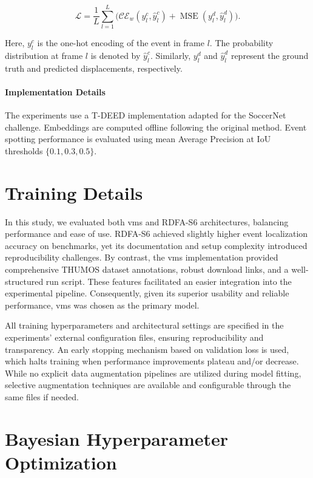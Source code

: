 \[
\mathcal{L} = \frac{1}{L}\sum_{l=1}^{L}\Big(\mathcal{CE}_{w}(y_l^{c},\hat{y}_l^c) + \operatorname{MSE}(y_l^{d},\hat{y}_l^d)\Big).
\]

Here, \(y_l^{c}\) is the one-hot encoding of the event in frame \(l\). The probability distribution at frame \(l\) is denoted by \(\hat{y}_l^c\). Similarly, \(y_l^{d}\) and \(\hat{y}_l^d\) represent the ground truth and predicted displacements, respectively.

\paragraph{Implementation Details} The experiments use a T-DEED implementation adapted for the SoccerNet challenge. Embeddings are computed offline following the original method. Event spotting performance is evaluated using mean Average Precision at IoU thresholds \(\{0.1,0.3,0.5\}\).


\section{Training Details}

In this study, we evaluated both \acrshort{vms} and RDFA-S6 architectures, balancing performance and ease of use. RDFA-S6 achieved slightly higher event localization accuracy on benchmarks, yet its documentation and setup complexity introduced reproducibility challenges. By contrast, the \acrshort{vms} implementation provided comprehensive THUMOS dataset annotations, robust download links, and a well-structured run script. These features facilitated an easier integration into the experimental pipeline. Consequently, given its superior usability and reliable performance, \acrshort{vms} was chosen as the primary model.

All training hyperparameters and architectural settings are specified in the experiments' external configuration files, ensuring reproducibility and transparency. An early stopping mechanism based on validation loss is used, which halts training when performance improvements plateau and/or decrease. While no explicit data augmentation pipelines are utilized during model fitting, selective augmentation techniques are available and configurable through the same files if needed.

\section{Bayesian Hyperparameter Optimization}
\label{sec:bayesian_optimization}

